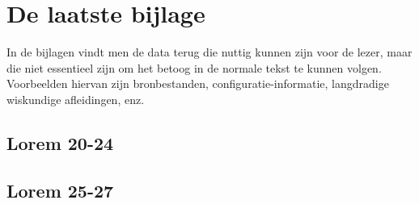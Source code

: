 \chapter{De laatste bijlage}
\label{app:n}
In de bijlagen vindt men de data terug die nuttig kunnen zijn voor de
lezer, maar die niet essentieel zijn om het betoog in de normale tekst te
kunnen volgen. Voorbeelden hiervan zijn bronbestanden,
configuratie-informatie, langdradige wiskundige afleidingen, enz.

\section{Lorem 20-24}
\lipsum[20-24]

\section{Lorem 25-27}
\lipsum[25-27]

